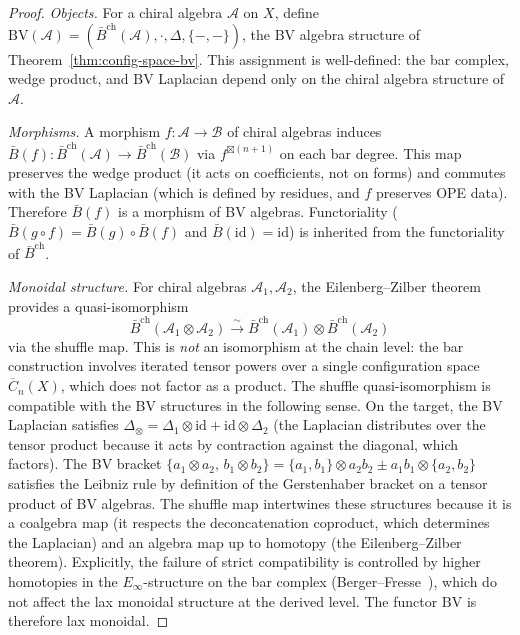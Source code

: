 \begin{proof}
\emph{Objects.}  For a chiral algebra $\mathcal{A}$ on $X$, define $\mathrm{BV}(\mathcal{A}) = (\bar{B}^{\mathrm{ch}}(\mathcal{A}), \cdot, \Delta, \{-,-\})$, the BV algebra structure of Theorem~\ref{thm:config-space-bv}.  This assignment is well-defined: the bar complex, wedge product, and BV Laplacian depend only on the chiral algebra structure of~$\mathcal{A}$.

\emph{Morphisms.}  A morphism $f: \mathcal{A} \to \mathcal{B}$ of chiral algebras induces $\bar{B}(f): \bar{B}^{\mathrm{ch}}(\mathcal{A}) \to \bar{B}^{\mathrm{ch}}(\mathcal{B})$ via $f^{\boxtimes(n+1)}$ on each bar degree.  This map preserves the wedge product (it acts on coefficients, not on forms) and commutes with the BV Laplacian (which is defined by residues, and $f$ preserves OPE data).  Therefore $\bar{B}(f)$ is a morphism of BV algebras.  Functoriality ($\bar{B}(g \circ f) = \bar{B}(g) \circ \bar{B}(f)$ and $\bar{B}(\mathrm{id}) = \mathrm{id}$) is inherited from the functoriality of $\bar{B}^{\mathrm{ch}}$.

\emph{Monoidal structure.}  For chiral algebras $\mathcal{A}_1, \mathcal{A}_2$, the Eilenberg--Zilber theorem provides a quasi-isomorphism
\[
\bar{B}^{\mathrm{ch}}(\mathcal{A}_1 \otimes \mathcal{A}_2) \xrightarrow{\sim} \bar{B}^{\mathrm{ch}}(\mathcal{A}_1) \otimes \bar{B}^{\mathrm{ch}}(\mathcal{A}_2)
\]
via the shuffle map.  This is \emph{not} an isomorphism at the chain level: the bar construction involves iterated tensor powers over a single configuration space $\overline{C}_n(X)$, which does not factor as a product.  The shuffle quasi-isomorphism is compatible with the BV structures
in the following sense.  On the target, the BV Laplacian satisfies
$\Delta_{\otimes} = \Delta_1 \otimes \mathrm{id}
+ \mathrm{id} \otimes \Delta_2$
(the Laplacian distributes over the tensor product because it acts
by contraction against the diagonal, which factors).
The BV bracket
$\{a_1 \otimes a_2,\, b_1 \otimes b_2\}
= \{a_1, b_1\} \otimes a_2 b_2
\pm a_1 b_1 \otimes \{a_2, b_2\}$
satisfies the Leibniz rule by definition of the Gerstenhaber bracket
on a tensor product of BV algebras.  The shuffle map intertwines
these structures because it is a coalgebra map (it respects the
deconcatenation coproduct, which determines the Laplacian) and an
algebra map up to homotopy (the Eilenberg--Zilber theorem).
Explicitly, the failure of strict compatibility is controlled by
higher homotopies in the $E_\infty$-structure on the bar complex
(Berger--Fresse~\cite[\S11]{BerFres04}), which do not affect the
lax monoidal structure at the derived level.  The functor
$\mathrm{BV}$ is therefore lax monoidal.


\end{proof}
